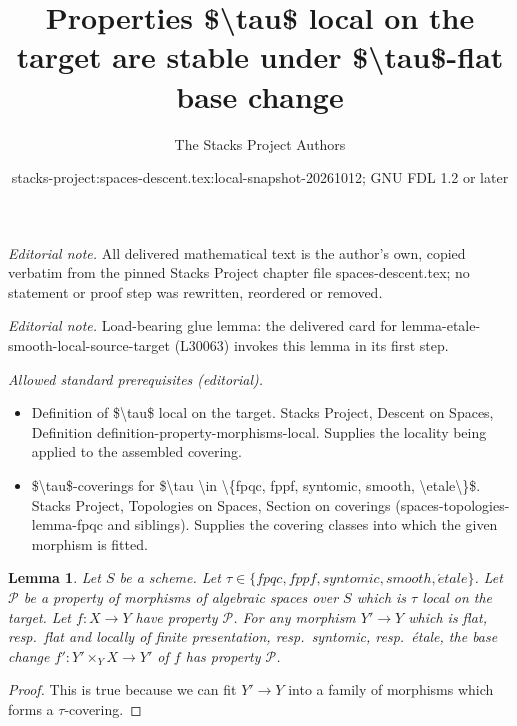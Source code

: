 \documentclass[10pt,a4paper]{amsart}
\title{Properties \$\textbackslash{}tau\$ local on the target are stable under \$\textbackslash{}tau\$-flat base change}
\author{The Stacks Project Authors}
\date{stacks-project:spaces-descent.tex:local-snapshot-20261012; GNU FDL 1.2 or later}
\theoremstyle{plain}
\newtheorem{lemma}[subsection]{Lemma}
\theoremstyle{definition}
\theoremstyle{remark}
\numberwithin{equation}{subsection}
\def\etale{{\acute{e}tale}}
\begin{document}
\maketitle
\noindent\textit{Editorial note.} All delivered mathematical text is the author's own, copied verbatim from the pinned Stacks Project chapter file spaces-descent.tex; no statement or proof step was rewritten, reordered or removed.\par\medskip
\noindent\textit{Editorial note.} Load-bearing glue lemma: the delivered card for lemma-etale-smooth-local-source-target (L30063) invokes this lemma in its first step.\par\medskip
\noindent\textit{Allowed standard prerequisites (editorial).}\begin{itemize}
\item Definition of \$\textbackslash{}tau\$ local on the target. Stacks Project, Descent on Spaces, Definition definition-property-morphisms-local. Supplies the locality being applied to the assembled covering.
\item \$\textbackslash{}tau\$-coverings for \$\textbackslash{}tau \textbackslash{}in \textbackslash{}\{fpqc, fppf, syntomic, smooth, \textbackslash{}etale\textbackslash{}\}\$. Stacks Project, Topologies on Spaces, Section on coverings (spaces-topologies-lemma-fpqc and siblings). Supplies the covering classes into which the given morphism is fitted.
\end{itemize}\medskip
\begin{lemma}
\label{lemma-pullback-property-local-target}
Let $S$ be a scheme.
Let $\tau \in \{fpqc, fppf, syntomic, smooth, \etale\}$.
Let $\mathcal{P}$ be a property of morphisms of algebraic spaces over $S$
which is $\tau$ local on the target. Let $f : X \to Y$ have property
$\mathcal{P}$. For any morphism $Y' \to Y$ which is
flat, resp.\ flat and locally of finite presentation, resp.\ syntomic,
resp.\ \'etale, the base change
$f' : Y' \times_Y X \to Y'$ of $f$ has property $\mathcal{P}$.
\end{lemma}

\begin{proof}
This is true because we can fit $Y' \to Y$ into a family of
morphisms which forms a $\tau$-covering.
\end{proof}
\end{document}

